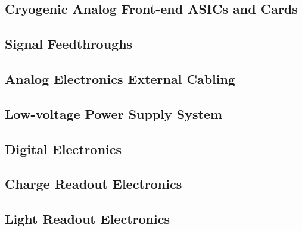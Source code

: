 

\subsection{Cryogenic Analog Front-end ASICs and Cards}
\label{sec:fddp-tpc-elec-prod-fe}

\subsection{Signal Feedthroughs}
\label{sec:fddp-tpc-elec-prod-sft}

\subsection{Analog Electronics External Cabling}
\label{sec:fddp-tpc-elec-prod-fecable}

\subsection{Low-voltage Power Supply System}
\label{sec:fddp-tpc-elec-prod-lvps}

\subsection{Digital Electronics}
\label{sec:fddp-tpc-elec-prod-utca}

\subsection{Charge Readout Electronics}
\label{sec:fddp-tpc-elec-prod-cro}

\subsection{Light Readout Electronics}
\label{sec:fddp-tpc-elec-prod-lro}






